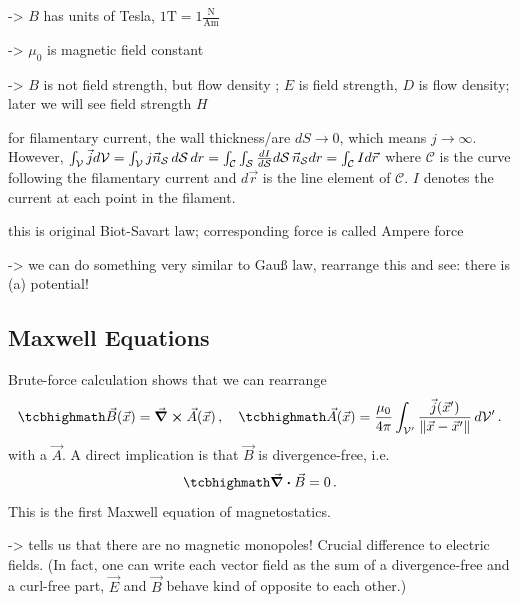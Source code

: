 \documentclass[../class_mech_main.tex]{subfiles}
\DeclareMathOperator{\fpmu}{\frac{\mu_0}{4 \pi}}
\begin{document}
-> $B$ has units of Tesla, $1 \mathrm{T} = 1 \frac{\mathrm{N}}{\mathrm{A} \mathrm{m}}$

-> $\mu_0$ is magnetic field constant

-> $B$ is not field strength, but flow density ; $E$ is field strength, $D$ is flow density; later we will see field strength $H$


\begin{ex}
    for filamentary current, the wall thickness/are $dS \rightarrow 0$, which means $j \rightarrow \infty$. However, $\int_\mathcal{V} \vec{j} d\mathcal{V} = \int_\mathcal{V} j \vec{n}_\mathcal{S} \, d\mathcal{S} \, dr = \int_\mathcal{C} \int_\mathcal{S} \dv{I}{\mathcal{S}} d\mathcal{S} \, \vec{n}_\mathcal{S} dr = \int_\mathcal{C} I d\vec{r}$ where $\mathcal{C}$ is the curve following the filamentary current and $d\vec{r}$ is the line element of $\mathcal{C}$. $I$ denotes the current at each point in the filament.

    this is original Biot-Savart law; corresponding force is called Ampere force
\end{ex}

-> we can do something very similar to Gauß law, rearrange this and see: there is (a) potential!



        \subsection{Maxwell Equations}
Brute-force calculation shows that we can rearrange
\begin{equation}
    \eqbox{
        \vec{B}(\vec{x}) = \curl \vec{A}(\vec{x})
    }
    \, , \quad
    \eqbox{
        \vec{A}(\vec{x}) = \fpmu \int_{\mathcal{V}'} \frac{\vec{j}(\vec{x}')}{\norm{\vec{x} - \vec{x}'}} \, d\mathcal{V}'
    } \, .
\end{equation}
with a  $\vec{A}$. A direct implication is that $\vec{B}$ is divergence-free, i.e.
\begin{equation}\label{eq:maxwell_magnstat_one_diff}
    \eqbox{
        \div \vec{B} = 0
    } \, .
\end{equation}
This is the first Maxwell equation of magnetostatics.

-> tells us that there are no magnetic monopoles! Crucial difference to electric fields. (In fact, one can write each vector field as the sum of a divergence-free and a curl-free part, $\vec{E}$ and $\vec{B}$ behave kind of opposite to each other.)
\end{document}
